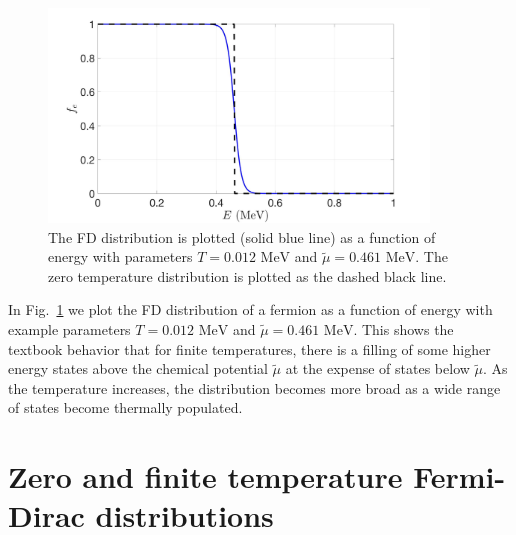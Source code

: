 \documentclass[sn-mathphys,Numbered]{sn-jnl}
\newcommand{\rf}[1]{Fig.~{\ref{#1}}}
\newcommand*{\MeV}{\text{ MeV}}
\begin{document}
\begin{figure}[ht]
\centering
\includegraphics[width=0.9\textwidth]{./plot/Electron_distribution001}
\caption{The FD distribution is plotted (solid blue line) as a function of energy with parameters $T=0.012\MeV$ and $\widetilde\mu=0.461\MeV$. The zero temperature distribution is plotted as the dashed black line.}
\label{Electron_001}
\end{figure}

In \rf{Electron_001} we plot the FD distribution of a fermion as a function of energy with example parameters $T=0.012\MeV$ and $\widetilde\mu=0.461\MeV$. This shows the textbook behavior that for finite temperatures, there is a filling of some higher energy states above the chemical potential $\widetilde\mu$ at the expense of states below $\widetilde\mu$. As the temperature increases, the distribution becomes more broad as a wide range of states become thermally populated.

\section{Zero and finite temperature Fermi-Dirac distributions}
\label{NewFermi}
\end{document}
